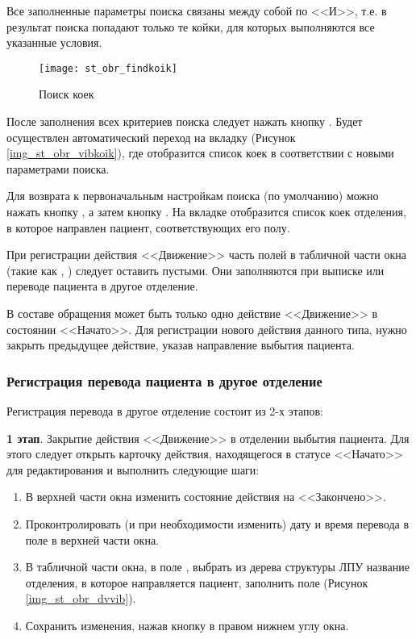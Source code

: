 Все заполненные параметры поиска связаны между собой по <<И>>, т.е. в результат поиска попадают только те койки, для которых выполняются все указанные условия.

\begin{figure}[ht]\centering
   \texttt{[image: st\_obr\_findkoik]}
   \caption{Поиск коек}
   \label{img_st_obr_findkoik}
\end{figure}
 
После заполнения всех критериев поиска следует нажать кнопку . Будет осуществлен автоматический переход на вкладку  (Рисунок \ref{img_st_obr_vibkoik}), где отобразится список коек в соответствии с новыми параметрами поиска.

Для возврата к первоначальным настройкам поиска (по умолчанию) можно нажать кнопку  , а затем кнопку  . На вкладке  отобразится список коек отделения, в которое направлен пациент, соответствующих его полу.

\begin{vnim}
 При регистрации действия <<Движение>> часть полей в табличной части окна (такие как , ) следует оставить пустыми. Они заполняются при выписке или переводе пациента в другое отделение.
\end{vnim}

\begin{vnim}
 В составе обращения может быть только одно действие <<Движение>> в состоянии <<Начато>>. Для регистрации нового действия данного типа, нужно закрыть предыдущее действие, указав направление выбытия пациента.
\end{vnim}

\subsubsection{Регистрация перевода пациента в другое отделение}

Регистрация перевода в другое отделение состоит из 2-х этапов:

\textbf{1 этап}. Закрытие действия <<Движение>> в отделении выбытия пациента. Для этого следует открыть карточку действия, находящегося в статусе <<Начато>> для редактирования и выполнить следующие шаги:
\begin{enumerate}
 \item В верхней части окна изменить состояние действия на <<Закончено>>.
 \item Проконтролировать (и при необходимости изменить) дату и время перевода в поле  в верхней части окна.
 \item В табличной части окна, в поле , выбрать из дерева структуры ЛПУ название отделения, в которое направляется пациент, заполнить поле  (Рисунок \ref{img_st_obr_dvvib}).
 \item Сохранить изменения, нажав кнопку  в правом нижнем углу окна.
\end{enumerate}

